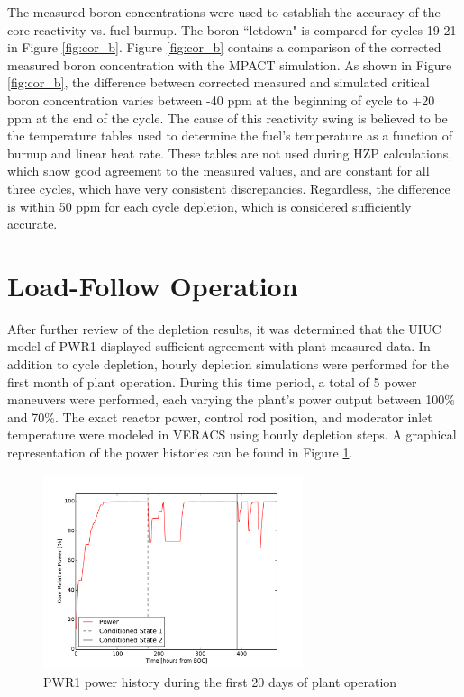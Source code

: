 \documentclass[edeposit,fullpage,11pt]{uiucthesis2009}
\begin{document}
The measured boron concentrations were used to establish the accuracy of the core reactivity vs. fuel burnup. 
The boron ``letdown" is compared for cycles 19-21 in Figure \ref{fig:cor_b}. 
Figure \ref{fig:cor_b} contains a comparison of the corrected measured boron concentration with the MPACT simulation. 
As shown in Figure \ref{fig:cor_b}, the difference between corrected measured and simulated critical boron concentration varies between -40 ppm at the beginning of cycle to +20 ppm at the end of the cycle. 
The cause of this reactivity swing is believed to be the temperature tables used to determine the fuel's temperature as a function of burnup and linear heat rate.
These tables are not used during \gls{HZP} calculations, which show good agreement to the measured values, and are constant for all three cycles, which have very consistent discrepancies.
Regardless, the difference is within 50 ppm for each cycle depletion, which is considered sufficiently accurate.

\section{Load-Follow Operation}

After further review of the depletion results, it was determined that the \gls{UIUC} model of PWR1 displayed sufficient agreement with plant measured data. 
In addition to cycle depletion, hourly depletion simulations were performed for the first month of plant operation.
During this time period, a total of 5 power maneuvers were performed, each varying the plant's power output between 100\% and 70\%.
The exact reactor power, control rod position, and moderator inlet temperature were modeled in \gls{VERACS} using hourly depletion steps.
A graphical representation of the power histories can be found in Figure \ref{fig:lf_his0}.

\begin{figure}[h]
\begin{center}
\includegraphics[width=3in]{./Figures/M_power_his.pdf} 
\end{center}
\caption{PWR1 power history during the first 20 days of plant operation}
\label{fig:lf_his0}
\end{figure}
\end{document}
